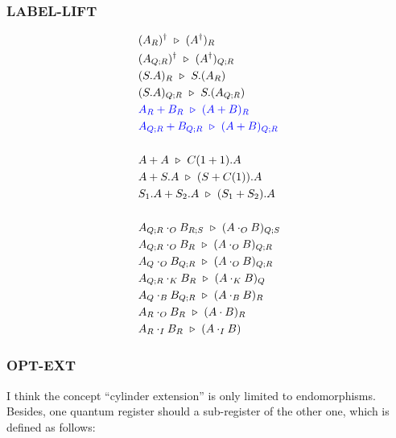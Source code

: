 \subsubsection*{\textsf{LABEL-LIFT}}
\begin{align*}
  & (A_{R})^\dagger \ \triangleright\  (A^\dagger)_{R} \\
  & (A_{Q; R})^\dagger \ \triangleright\  (A^\dagger)_{Q; R} \\
  & (S.A)_{R} \ \triangleright\  S.(A_{R}) \\
  & (S.A)_{Q; R} \ \triangleright\  S.(A_{Q; R})\\
  & \textcolor{blue}{A_{R} + B_{R} \ \triangleright\  (A + B)_{R}} \\
  & \textcolor{blue}{A_{Q; R} + B_{Q; R} \ \triangleright\  (A + B)_{Q; R}} \\
  \\
  & A + A \ \triangleright\  C(1 + 1).A \\
  & A + S.A \ \triangleright\  (S + C(1)).A \\
  & S_1.A + S_2.A \ \triangleright\  (S_1 + S_2).A \\
  \\
  & A_{Q; R} \cdot_O B_{R; S} \ \triangleright\  (A \cdot_O B)_{Q; S} \\
  & A_{Q; R} \cdot_O B_{R} \ \triangleright\  (A \cdot_O B)_{Q; R} \\
  & A_{Q} \cdot_O B_{Q; R} \ \triangleright\  (A \cdot_O B)_{Q; R} \\
  & A_{Q; R} \cdot_K B_{R} \ \triangleright\  (A \cdot_K B)_{Q} \\
  & A_{Q} \cdot_B B_{Q; R} \ \triangleright\  (A \cdot_B B)_{R} \\
  & A_{R} \cdot_O B_{R} \ \triangleright\  (A \cdot B)_{R} \\
  & A_{R} \cdot_I B_{R} \ \triangleright\  (A \cdot_I B) \\
\end{align*}


\subsubsection*{\textsf{OPT-EXT}}
I think the concept ``cylinder extension'' is only limited to endomorphisms. Besides, one quantum register should a sub-register of the other one, which is defined as follows:

